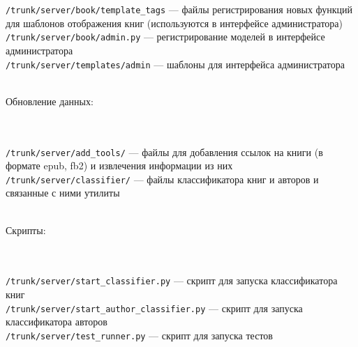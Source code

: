 \documentclass[a4paper]{article}
\begin{document}
{{\tt /trunk/server/book/template\_tags} --- файлы регистрирования новых функций для шаблонов отображения книг (используются в интерфейсе администратора)\\
{\tt /trunk/server/book/admin.py} --- регистрирование моделей в интерфейсе администратора\\
{\tt /trunk/server/templates/admin} --- шаблоны для интерфейса администратора
\\
\\
\begin{normalsize}Обновление данных:\end{normalsize}
\\
\\
{\tt /trunk/server/add\_tools/} --- файлы для добавления ссылок на книги (в формате epub, fb2) и извлечения информации из них\\
{\tt /trunk/server/classifier/} --- файлы классификатора книг и авторов и связанные с ними утилиты\\
\\
\begin{normalsize}Скрипты:\end{normalsize}
\\
\\
{\tt /trunk/server/start\_classifier.py} --- скрипт для запуска классификатора книг\\
{\tt /trunk/server/start\_author\_classifier.py} --- скрипт для запуска классификатора авторов\\
{\tt /trunk/server/test\_runner.py} --- скрипт для запуска тестов\\

\newpage
}
\end{document}
